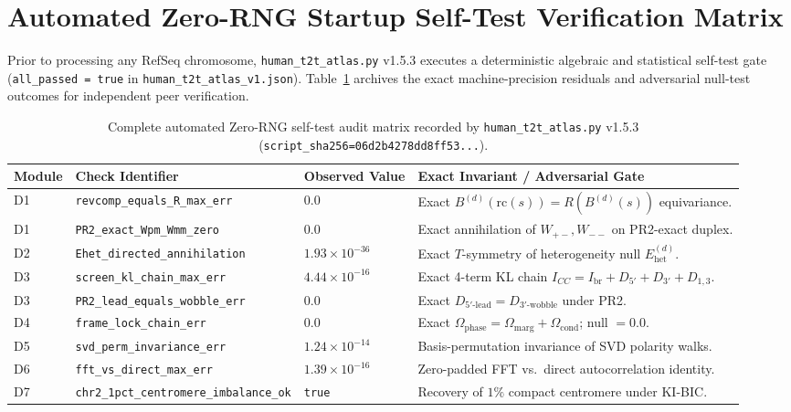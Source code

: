 \documentclass[11pt,a4paper]{article}
\newcommand{\Wpm}{W_{+-}}
\newcommand{\Wmm}{W_{--}}
\begin{document}
\clearpage
\appendix
\section{Automated Zero-RNG Startup Self-Test Verification Matrix}
\label{app:selftest}
Prior to processing any RefSeq chromosome, \texttt{human\_t2t\_atlas.py} v1.5.3 executes a deterministic algebraic and statistical self-test gate (\texttt{all\_passed = true} in \texttt{human\_t2t\_atlas\_v1.json}). Table~\ref{tab:selftest} archives the exact machine-precision residuals and adversarial null-test outcomes for independent peer verification.

\begin{table}[htbp]
\centering
\caption{Complete automated Zero-RNG self-test audit matrix recorded by \texttt{human\_t2t\_atlas.py} v1.5.3 (\texttt{script\_sha256=06d2b4278dd8ff53...}).}
\label{tab:selftest}
\scriptsize
\begin{tabularx}{\textwidth}{@{}lllX@{}}
\toprule
\textbf{Module} & \textbf{Check Identifier} & \textbf{Observed Value} & \textbf{Exact Invariant / Adversarial Gate} \\
\midrule
D1 & \texttt{revcomp\_equals\_R\_max\_err} & $0.0$ & Exact $B^{(d)}(\mathrm{rc}(s)) = R(B^{(d)}(s))$ equivariance. \\
D1 & \texttt{PR2\_exact\_Wpm\_Wmm\_zero} & $0.0$ & Exact annihilation of $\Wpm,\Wmm$ on PR2-exact duplex. \\
D2 & \texttt{Ehet\_directed\_annihilation} & $1.93\times 10^{-36}$ & Exact $T$-symmetry of heterogeneity null $E_{\mathrm{het}}^{(d)}$. \\
D3 & \texttt{screen\_kl\_chain\_max\_err} & $4.44\times 10^{-16}$ & Exact 4-term KL chain $I_{CC}=I_{\mathrm{br}}+D_{5'}+D_{3'}+D_{1,3}$. \\
D3 & \texttt{PR2\_lead\_equals\_wobble\_err} & $0.0$ & Exact $D_{5'\text{-lead}} = D_{3'\text{-wobble}}$ under PR2. \\
D4 & \texttt{frame\_lock\_chain\_err} & $0.0$ & Exact $\Omega_{\mathrm{phase}} = \Omega_{\mathrm{marg}}+\Omega_{\mathrm{cond}}$; null $=0.0$. \\
D5 & \texttt{svd\_perm\_invariance\_err} & $1.24\times 10^{-14}$ & Basis-permutation invariance of SVD polarity walks. \\
D6 & \texttt{fft\_vs\_direct\_max\_err} & $1.39\times 10^{-16}$ & Zero-padded FFT vs.\ direct autocorrelation identity. \\
D7 & \texttt{chr2\_1pct\_centromere\_imbalance\_ok} & \texttt{true} & Recovery of $1\%$ compact centromere under KI-BIC. \\

\end{tabularx}
\end{table}
\end{document}
